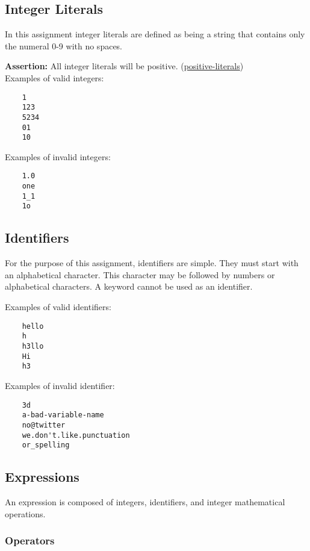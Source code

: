 \documentclass{article}
\newcommand{\assertion}[2]{\textbf{Assertion: }#1 (\hyperlink{#2}{#2})}
\begin{document}
\subsection {Integer Literals}
In this assignment integer literals are defined as being a string that contains only the numeral 0-9 with no spaces.

\assertion{All integer literals will be positive.}{positive-literals}\\

Examples of valid integers:
\begin{lstlisting}
	1
	123
	5234
	01
	10
\end{lstlisting}

Examples of invalid integers:
\begin{lstlisting}
	1.0
	one
	1_1
	1o
\end{lstlisting}

\subsection{Identifiers}
For the purpose of this assignment, identifiers are simple. They must start with an alphabetical
character. This character may be followed by numbers or alphabetical characters. A keyword cannot
be used as an identifier.

Examples of valid identifiers:
\begin{lstlisting}
	hello
	h
	h3llo
	Hi
	h3
\end{lstlisting}

Examples of invalid identifier:
\begin{lstlisting}
	3d
	a-bad-variable-name
	no@twitter
	we.don't.like.punctuation
	or_spelling
\end{lstlisting}

\subsection{Expressions}
An expression is composed of integers, identifiers, and integer mathematical operations.

\subsubsection{Operators}
\end{document}
